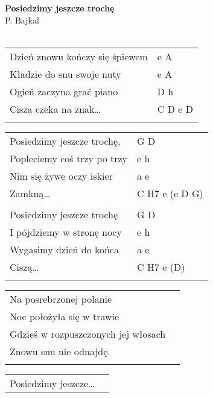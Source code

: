 \documentclass[a5paper]{article}
\begin{document}


\noindent
\fontsize{12pt}{15pt}\selectfont
\textbf{Posiedzimy jeszcze trochę} \\
\fontsize{8pt}{10pt}\selectfont
P. Bajkal \\ \\
\fontsize{10pt}{12pt}\selectfont
{}
\begin{tabular}{@{}p{7.50cm}p{3cm}@{}}
\noindent
Dzień znowu kończy się śpiewem & e A \\
Kładzie do snu swoje nuty & e A \\
Ogień zaczyna grać piano & D h \\
Cisza czeka na znak… & C D e D \\ \\
\end{tabular}

\noindent
\begin{tabular}{@{}p{6.50cm}p{3cm}@{}}
Posiedzimy jeszcze trochę, & G D \\
Popleciemy coś trzy po trzy & e h \\
Nim się żywe oczy iskier & a e \\
Zamkną… & C H7 e (e D G) \\ \\

Posiedzimy jeszcze trochę & G D \\
I pójdziemy w stronę nocy & e h \\
Wygasimy dzień do końca & a e \\
Ciszą… & C H7 e (D) \\ \\
\end{tabular}

\noindent
\begin{tabular}{@{}p{7.50cm}p{3cm}@{}}
Na posrebrzonej polanie \\
Noc położyła się w trawie \\
Gdzieś w rozpuszczonych jej włosach \\
Znowu snu nie odnajdę. \\ \\
\end{tabular}

\noindent
\begin{tabular}{@{}p{6.50cm}p{3cm}@{}}
Posiedzimy jeszcze…
\end{tabular}
\end{document}
